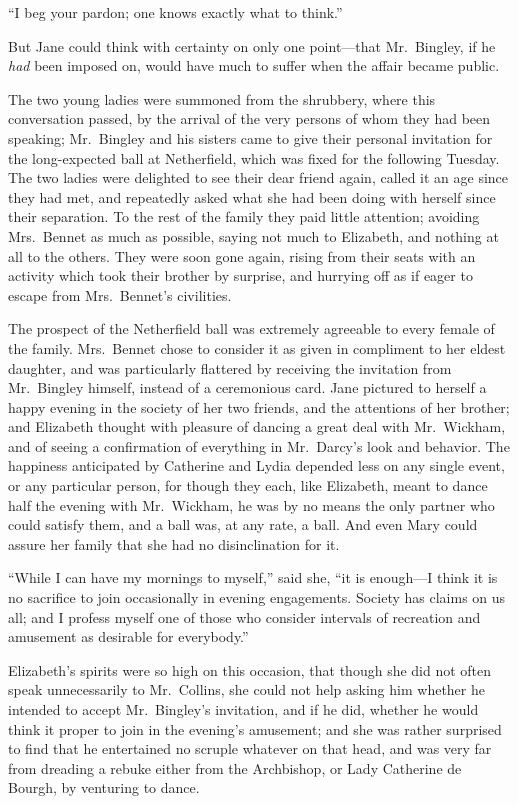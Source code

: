 \documentclass[12pt,english]{book}
\begin{document}
{}``I beg your pardon; one knows exactly what to think.''

But Jane could think with certainty on only one point\mbox{---}that
Mr.\ Bingley, if he \textit{had} been imposed on, would have much
to suffer when the affair became public.

The two young ladies were summoned from the shrubbery, where this
conversation passed, by the arrival of the very persons of whom they
had been speaking; Mr.\ Bingley and his sisters came to give their
personal invitation for the long-expected ball at Netherfield, which
was fixed for the following Tuesday. The two ladies were delighted
to see their dear friend again, called it an age since they had met,
and repeatedly asked what she had been doing with herself since their
separation. To the rest of the family they paid little attention;
avoiding Mrs.\ Bennet as much as possible, saying not much to Elizabeth,
and nothing at all to the others. They were soon gone again, rising
from their seats with an activity which took their brother by surprise,
and hurrying off as if eager to escape from Mrs.\ Bennet's civilities.

The prospect of the Netherfield ball was extremely agreeable to every
female of the family. Mrs.\ Bennet chose to consider it as given
in compliment to her eldest daughter, and was particularly flattered
by receiving the invitation from Mr.\ Bingley himself, instead of
a ceremonious card. Jane pictured to herself a happy evening in the
society of her two friends, and the attentions of her brother; and
Elizabeth thought with pleasure of dancing a great deal with Mr.\ Wickham,
and of seeing a confirmation of everything in Mr.\ Darcy's look and
behavior. The happiness anticipated by Catherine and Lydia depended
less on any single event, or any particular person, for though they
each, like Elizabeth, meant to dance half the evening with Mr.\ Wickham,
he was by no means the only partner who could satisfy them, and a
ball was, at any rate, a ball. And even Mary could assure her family
that she had no disinclination for it.

{}``While I can have my mornings to myself,'' said she, {}``it
is enough\mbox{---}I think it is no sacrifice to join occasionally
in evening engagements. Society has claims on us all; and I profess
myself one of those who consider intervals of recreation and amusement
as desirable for everybody.''

Elizabeth's spirits were so high on this occasion, that though she
did not often speak unnecessarily to Mr.\ Collins, she could not
help asking him whether he intended to accept Mr.\ Bingley's invitation,
and if he did, whether he would think it proper to join in the evening's
amusement; and she was rather surprised to find that he entertained
no scruple whatever on that head, and was very far from dreading a
rebuke either from the Archbishop, or Lady Catherine de Bourgh, by
venturing to dance.
\end{document}
